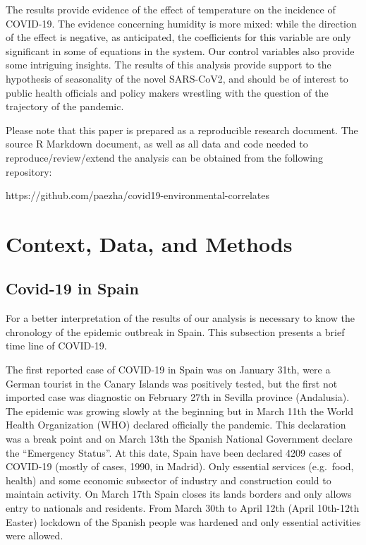 \documentclass[]{elsarticle} %
\begin{document}
The results provide evidence of the effect of temperature on the
incidence of COVID-19. The evidence concerning humidity is more mixed:
while the direction of the effect is negative, as anticipated, the
coefficients for this variable are only significant in some of equations
in the system. Our control variables also provide some intriguing
insights. The results of this analysis provide support to the hypothesis
of seasonality of the novel SARS-CoV2, and should be of interest to
public health officials and policy makers wrestling with the question of
the trajectory of the pandemic.

Please note that this paper is prepared as a reproducible research
document. The source R Markdown document, as well as all data and code
needed to reproduce/review/extend the analysis can be obtained from the
following repository:

https://github.com/paezha/covid19-environmental-correlates

\hypertarget{context-data-and-methods}{%
\section{Context, Data, and Methods}\label{context-data-and-methods}}

\hypertarget{covid-19-in-spain}{%
\subsection{Covid-19 in Spain}\label{covid-19-in-spain}}

For a better interpretation of the results of our analysis is necessary
to know the chronology of the epidemic outbreak in Spain. This
subsection presents a brief time line of COVID-19.

The first reported case of COVID-19 in Spain was on January 31th, were a
German tourist in the Canary Islands was positively tested, but the
first not imported case was diagnostic on February 27th in Sevilla
province (Andalusia). The epidemic was growing slowly at the beginning
but in March 11th the World Health Organization (WHO) declared
officially the pandemic. This declaration was a break point and on March
13th the Spanish National Government declare the ``Emergency Status''.
At this date, Spain have been declared 4209 cases of COVID-19 (mostly of
cases, 1990, in Madrid). Only essential services (e.g.~food, health) and
some economic subsector of industry and construction could to maintain
activity. On March 17th Spain closes its lands borders and only allows
entry to nationals and residents. From March 30th to April 12th (April
10th-12th Easter) lockdown of the Spanish people was hardened and only
essential activities were allowed.
\end{document}
